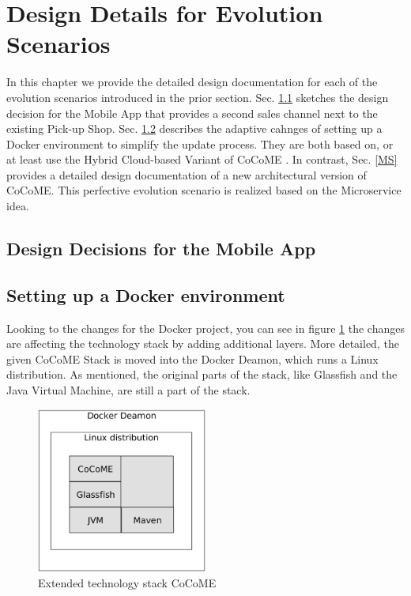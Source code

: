 \section{Design Details for Evolution Scenarios}
In this chapter we provide the detailed design documentation for each of the evolution scenarios
introduced in the prior section. Sec. \ref{App} sketches the design decision for the Mobile App that provides a second sales channel next to the existing Pick-up Shop. Sec. \ref{Docker} describes the adaptive cahnges of setting up a Docker environment to simplify the update process. They are both based on, or at least use the Hybrid Cloud-based Variant of CoCoME \cite{SWB-469002735}. In contrast, Sec. \ref{MS} provides a detailed design documentation of a new architectural version of CoCoME. This perfective evolution scenario is realized based on the Microservice idea.

\subsection{Design Decisions for the Mobile App} \label{App}


\subsection{Setting up a Docker environment} \label{Docker}
	Looking to the changes for the Docker project, you can see in figure \ref*{techStack} the changes are affecting the technology stack by adding additional layers. More detailed, the given CoCoME Stack is moved into the Docker Deamon, which runs a Linux distribution. As mentioned, the original parts of the stack, like Glassfish and the Java Virtual Machine, are still a part of the stack.\\
	\begin{figure}[H]
		\centering
		\includegraphics[width = 0.5\textwidth]{img/tech_stack_CoCoME.png}
		\caption{Extended technology stack CoCoME}
		\label{techStack}
	\end{figure}
	
